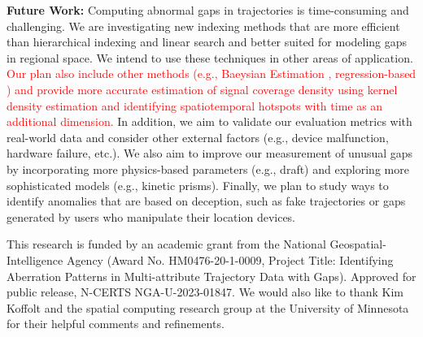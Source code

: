 \documentclass[acmsmall]{acmart}
\begin{document}

\textbf{Future Work:} Computing abnormal gaps in trajectories is time-consuming and challenging. We are investigating new indexing methods that are more efficient than hierarchical indexing and linear search and better suited for modeling gaps in regional space. We intend to use these techniques in other areas of application. \textcolor{red}{Our plan also include other methods (e.g., Baeysian Estimation \cite{hruschka2007bayesian}, regression-based \cite{fox2015applied}) and provide more accurate estimation of signal coverage density using kernel density estimation and identifying spatiotemporal hotspots with time as an additional dimension.} In addition, we aim to validate our evaluation metrics with real-world data and consider other external factors (e.g., device malfunction, hardware failure, etc.). We also aim to improve our measurement of unusual gaps by incorporating more physics-based parameters (e.g., draft) and exploring more sophisticated models (e.g., kinetic prisms). Finally, we plan to study ways to identify anomalies that are based on deception, such as fake trajectories or gaps generated by users who manipulate their location devices.

\begin{acks}
This research is funded by an academic grant from the National Geospatial-Intelligence Agency (Award No. HM0476-20-1-0009, Project Title: Identifying Aberration Patterns in Multi-attribute Trajectory Data with Gaps). Approved for public release, N-CERTS NGA-U-2023-01847. We would also like to thank Kim Koffolt and the spatial computing research group at the University of Minnesota for their helpful comments and refinements.
\end{acks}
\end{document}
